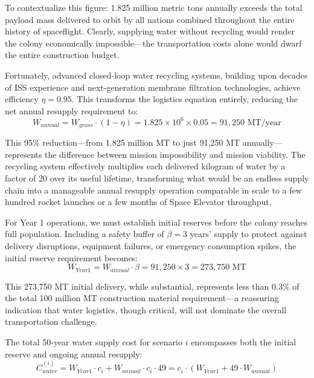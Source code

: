 \documentclass[12pt]{article}
\begin{document}
To contextualize this figure: 1.825 million metric tons annually exceeds the total payload mass delivered to orbit by all nations combined throughout the entire history of spaceflight. Clearly, supplying water without recycling would render the colony economically impossible---the transportation costs alone would dwarf the entire construction budget.

Fortunately, advanced closed-loop water recycling systems, building upon decades of ISS experience and next-generation membrane filtration technologies, achieve efficiency $\eta = 0.95$. This transforms the logistics equation entirely, reducing the net annual resupply requirement to:
\begin{equation}
	W_{annual} = W_{gross} \cdot (1 - \eta) = 1.825 \times 10^6 \times 0.05 = 91,250 \text{ MT/year}
\end{equation}

This 95\% reduction---from 1.825 million MT to just 91,250 MT annually---represents the difference between mission impossibility and mission viability. The recycling system effectively multiplies each delivered kilogram of water by a factor of 20 over its useful lifetime, transforming what would be an endless supply chain into a manageable annual resupply operation comparable in scale to a few hundred rocket launches or a few months of Space Elevator throughput.

For Year 1 operations, we must establish initial reserves before the colony reaches full population. Including a safety buffer of $\beta = 3$ years' supply to protect against delivery disruptions, equipment failures, or emergency consumption spikes, the initial reserve requirement becomes:
\begin{equation}
	W_{Year1} = W_{annual} \cdot \beta = 91,250 \times 3 = 273,750 \text{ MT}
\end{equation}

This 273,750 MT initial delivery, while substantial, represents less than 0.3\% of the total 100 million MT construction material requirement---a reassuring indication that water logistics, though critical, will not dominate the overall transportation challenge.

The total 50-year water supply cost for scenario $i$ encompasses both the initial reserve and ongoing annual resupply:
\begin{equation}
	C_{water}^{(i)} = W_{Year1} \cdot c_i + W_{annual} \cdot c_i \cdot 49 = c_i \cdot (W_{Year1} + 49 \cdot W_{annual})
\end{equation}
\end{document}
